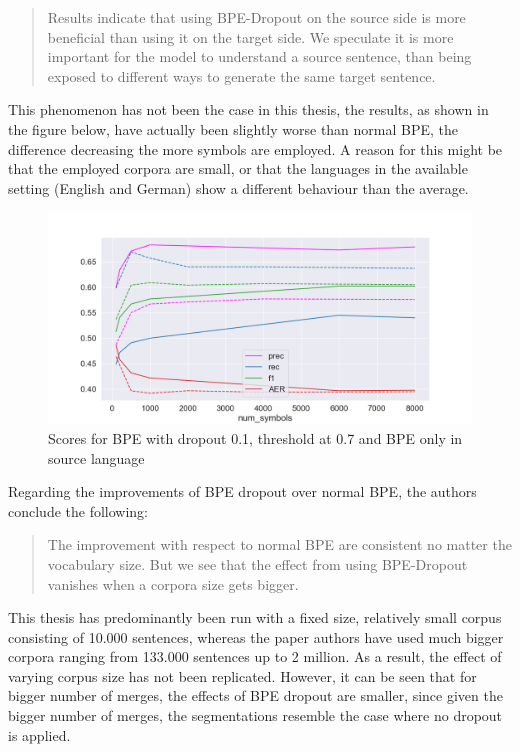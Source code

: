 \begin{quote}
	Results indicate that using BPE-Dropout on the source side is more beneficial than using it on the target side. We speculate it is more important for the model to understand a source sentence, than being exposed to different ways to generate the same target sentence.
\end{quote}

This phenomenon has not been the case in this thesis, the results, as shown in the figure below, have actually been slightly worse than normal BPE, the difference decreasing the more symbols are employed. A reason for this might be that the employed corpora are small, or that the languages in the available setting (English and German) show a different behaviour than the average.

\begin{figure}[!ht]
    \centering
    \includegraphics[width=11.5cm]{../reports/scores_dropout_bpe/space/0.1/0.7_thres_fastalign_eng.png}
    \caption{Scores for BPE with dropout 0.1, threshold at 0.7 and BPE only in source language}
\end{figure}

Regarding the improvements of BPE dropout over normal BPE, the authors conclude the following:

\begin{quote}
	The improvement with respect to normal BPE are consistent no matter the vocabulary size. But we see that the effect from using BPE-Dropout vanishes when a corpora size gets bigger.
\end{quote}

This thesis has predominantly been run with a fixed size, relatively small corpus consisting of 10.000 sentences, whereas the paper authors have used much bigger corpora ranging from 133.000 sentences up to 2 million. As a result, the effect of varying corpus size has not been replicated. However, it can be seen that for bigger number of merges, the effects of BPE dropout are smaller, since given the bigger number of merges, the segmentations resemble the case where no dropout is applied.

